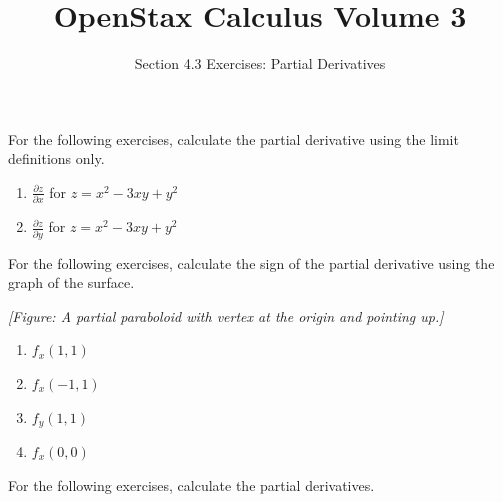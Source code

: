 \documentclass{exercises}
\title{OpenStax Calculus Volume 3}
\subtitle{Section 4.3 Exercises: Partial Derivatives}
\author{}
\date{}
\begin{document}
\maketitle


For the following exercises, calculate the partial derivative using the limit definitions only.

\begin{enumerate}[start=1]
\item $\frac{\partial z}{\partial x}$ for $z=x^{2}-3xy+y^{2}$
\item $\frac{\partial z}{\partial y}$ for $z=x^{2}-3xy+y^{2}$
\end{enumerate}

For the following exercises, calculate the sign of the partial derivative using the graph of the surface.


\textit{[Figure: A partial paraboloid with vertex at the origin and pointing up.]}

\begin{enumerate}[resume]
\item $f_{x}(1,1)$
\item $f_{x}(-1,1)$
\item $f_{y}(1,1)$
\item $f_{x}(0,0)$
\end{enumerate}

For the following exercises, calculate the partial derivatives.
\end{document}
